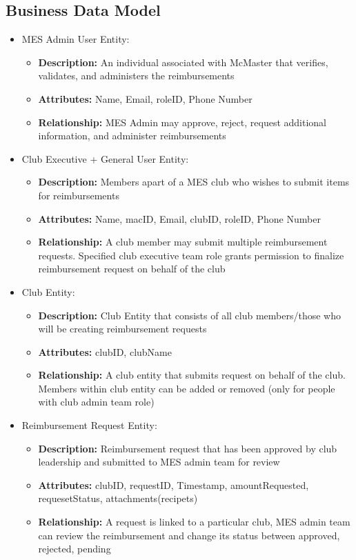 \documentclass[12pt]{article}
\begin{document}
  \subsection{Business Data Model}
  \begin{itemize}
    \item MES Admin User Entity:
      \begin{itemize}
        \item \textbf{Description:} An individual associated with McMaster that verifies, validates, and administers the reimbursements
        \item \textbf{Attributes:} Name, Email, roleID, Phone Number
        \item \textbf{Relationship:} MES Admin may approve, reject, request additional information, and administer reimbursements 
      \end{itemize}
    
    \item Club Executive + General User Entity:
      \begin{itemize}
          \item \textbf{Description:} Members apart of a MES club who wishes to submit items for reimbursements
          \item \textbf{Attributes:} Name, macID, Email, clubID, roleID, Phone Number
          \item \textbf{Relationship:} A club member may submit multiple reimbursement requests. Specified club executive team role grants permission to finalize reimbursement request on behalf of the club
        \end{itemize}

    \item Club Entity:
      \begin{itemize}
          \item \textbf{Description:} Club Entity that consists of all club members/those who will be creating reimbursement requests
          \item \textbf{Attributes:} clubID, clubName
          \item \textbf{Relationship:} A club entity that submits request on behalf of the club. Members within club entity can be added or removed (only for people with club admin team role)
        \end{itemize}
    
    \item Reimbursement Request Entity:
      \begin{itemize}
          \item \textbf{Description:} Reimbursement request that has been approved by club leadership and submitted to MES admin team for review
          \item \textbf{Attributes:} clubID, requestID, Timestamp, amountRequested, requesetStatus, attachments(recipets)
          \item \textbf{Relationship:} A request is linked to a particular club, MES admin team can review the reimbursement and change its status between approved, rejected, pending
        \end{itemize}
    

\end{itemize}
\end{document}
